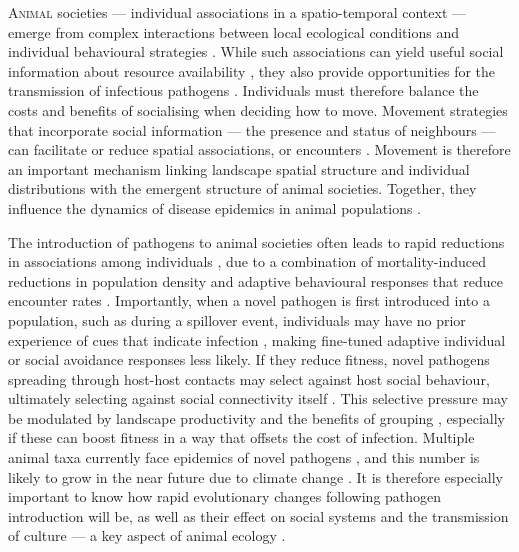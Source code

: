 
\newrefcontext[sorting=ynt]

\lettrine{A}{nimal} societies --- individual associations in a spatio-temporal context --- emerge from complex interactions between local ecological conditions and individual behavioural strategies \citep[][]{whitehead2008,tanner2012,webber2018}.
While such associations can yield useful social information about resource availability \citep{danchin2004,dall2005,gil2018}, they also provide opportunities for the transmission of infectious pathogens \citep[][]{krause2002,weinstein2018,cantor2021,romano2020,albery2021,romano2021}.
Individuals must therefore balance the costs and benefits of socialising when deciding how to move.
Movement strategies that incorporate social information --- the presence and status of neighbours --- can facilitate or reduce spatial associations, or encounters \citep{danchin2004,dall2005,nathan2008a,gil2018,webber2018,webber2022}.
Movement is therefore an important mechanism linking landscape spatial structure and individual distributions with the emergent structure of animal societies.
Together, they influence the dynamics of disease epidemics in animal populations \citep{white2018a,romano2020,romano2021}.

The introduction of pathogens to animal societies often leads to rapid reductions in associations among individuals \citep[][]{romano2020}, due to a combination of mortality-induced reductions in population density \citep[e.g.][]{fereidouni2019} and adaptive behavioural responses that reduce encounter rates \citep{stroeymeyt2018,romano2020,stockmaier2021}.
Importantly, when a novel pathogen is first introduced into a population, such as during a spillover event, individuals may have no prior experience of cues that indicate infection \citep{power2004}, making fine-tuned adaptive individual 
or social 
avoidance responses less likely.
If they reduce fitness, novel pathogens spreading through host-host contacts may select against host social behaviour, ultimately selecting against social connectivity itself \citep{altizer2003,ashby2021,cantor2021,romano2021,poulin2021}.
This selective pressure may be modulated by landscape productivity \citep{hutchings2006} and the benefits of grouping \citep[][]{almberg2015,ezenwa2016}, especially if these can boost fitness in a way that offsets the cost of infection.
Multiple animal taxa currently face epidemics of novel pathogens \citep{blehert2009,globconsorth5n82016,fereidouni2019,scheele2019}, and this number is likely to grow in the near future due to climate change \citep{sanderson2020,carlson2021}.
It is therefore especially important to know how rapid evolutionary changes following pathogen introduction will be, as well as their effect on social systems and the transmission of culture --- a key aspect of animal ecology \citep{cantor2021, cantor2021a}.

